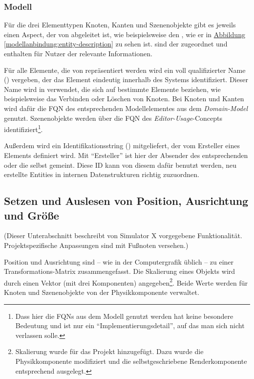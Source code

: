 \documentclass[a4paper,10pt]{sphinxmanual}
\begin{document}
\subsubsection{Modell}
\label{modellanbindung:modell}
Für die drei Elementtypen Knoten, Kanten und Szenenobjekte gibt es jeweils einen Aspect, der von  abgeleitet ist, wie beispielsweise den , wie er in \hyperref[modellanbindung:entity-description]{Abbildung  \ref*{modellanbindung:entity-description}} zu sehen ist.
 sind der  zugeordnet und enthalten für Nutzer der  relevante Informationen.

Für alle Elemente, die von  repräsentiert werden wird ein voll qualifizierter Name () vergeben, der das Element eindeutig innerhalb des Systems identifiziert.
Dieser Name wird in  verwendet, die sich auf bestimmte Elemente beziehen, wie beispielsweise das Verbinden oder Löschen von Knoten.
Bei Knoten und Kanten wird dafür die FQN des entsprechenden Modellelementes aus dem \emph{Domain-Model} genutzt. Szenenobjekte werden über die FQN des \emph{Editor-Usage}-Concepts identifiziert\footnote{
Dass hier die FQNs aus dem Modell genutzt werden hat keine besondere Bedeutung und ist nur ein "`Implementierungsdetail"', auf das man sich nicht verlassen solle.
}.

Außerdem wird ein Identifikationsstring () mitgeliefert, der vom Ersteller eines Elements definiert wird.
Mit "`Ersteller"' ist hier der Absender des entsprechenden  oder die  selbst gemeint.
Diese ID kann von diesem dafür benutzt werden, neu erstellte Entities in internen Datenstrukturen richtig zuzuordnen.


\subsection{Setzen und Auslesen von Position, Ausrichtung und Größe}
\label{modellanbindung:model-svars-transformation}\label{modellanbindung:setzen-und-auslesen-von-position-ausrichtung-und-grosze}
(Dieser Unterabschnitt beschreibt von Simulator X vorgegebene Funktionalität. Projektspezifische Anpassungen sind mit Fußnoten versehen.)

Position und Ausrichtung sind – wie in der Computergrafik üblich \cite{akenine-moller_real-time_2008} – zu einer Transformations-Matrix zusammengefasst.
Die Skalierung eines Objekts wird durch einen Vektor (mit drei Komponenten) angegeben\footnote{
Skalierung wurde für das Projekt hinzugefügt. Dazu wurde die Physikkomponente modifiziert und die selbstgeschriebene Renderkomponente entsprechend ausgelegt.
}.
Beide Werte werden für Knoten und Szenenobjekte von der Physikkomponente verwaltet.
\end{document}
